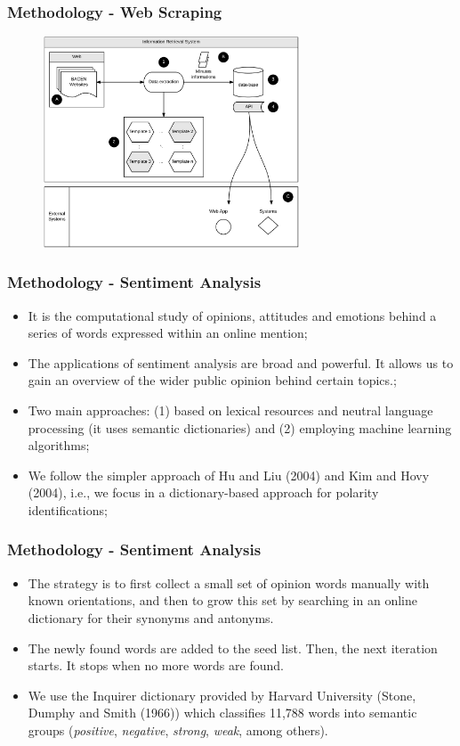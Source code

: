 \documentclass[aspectratio=169]{beamer}
\begin{document}
\begin{frame}\frametitle{Methodology - Web Scraping}
  \begin{figure}[hb]
  \includegraphics[width=3in]{minutes_crawler_diagram.png}
  \label{fig01}
  \end{figure}
\end{frame}

\begin{frame}\frametitle{Methodology - Sentiment Analysis}
  \begin{itemize}
  	\item It is the computational study of opinions, attitudes and emotions behind a series of words expressed within an online mention;
    \item The applications of sentiment analysis are broad and powerful. It allows us to gain an overview of the wider public opinion behind certain topics.;
    \item Two main approaches: (1) based on lexical resources and neutral language processing (it uses semantic dictionaries) and (2) employing machine learning algorithms;
    \item We follow the simpler approach of Hu and Liu (2004) and Kim and Hovy (2004), i.e., we focus in a dictionary-based approach for polarity identifications;
    \end{itemize}
\end{frame}

\begin{frame}\frametitle{Methodology - Sentiment Analysis}
\begin{itemize}
		\item The strategy is to first collect a small set of opinion words manually with known orientations, and then to grow this set by searching in an online dictionary for their synonyms and antonyms.
		\item The newly found words are added to the seed list. Then, the next iteration starts. It stops when no more words are found.
		\item We use the Inquirer dictionary provided by Harvard University (Stone, Dumphy and Smith (1966)) which classifies 11,788 words into semantic groups (\emph{positive}, \emph{negative}, \emph{strong}, \emph{weak}, among others).
\end{itemize}
\end{frame}
\end{document}
